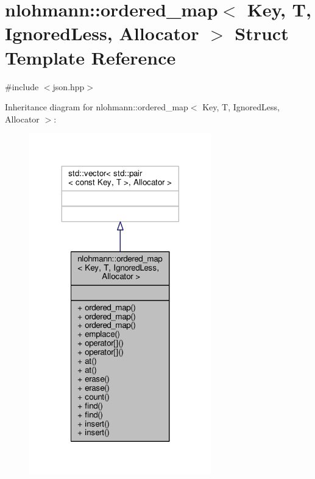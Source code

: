 \hypertarget{structnlohmann_1_1ordered__map}{}\section{nlohmann\+:\+:ordered\+\_\+map$<$ Key, T, Ignored\+Less, Allocator $>$ Struct Template Reference}
\label{structnlohmann_1_1ordered__map}


{\ttfamily \#include $<$json.\+hpp$>$}



Inheritance diagram for nlohmann\+:\+:ordered\+\_\+map$<$ Key, T, Ignored\+Less, Allocator $>$\+:
\nopagebreak
\begin{figure}[H]
\begin{center}
\leavevmode
\includegraphics[width=224pt]{structnlohmann_1_1ordered__map__inherit__graph}
\end{center}
\end{figure}


